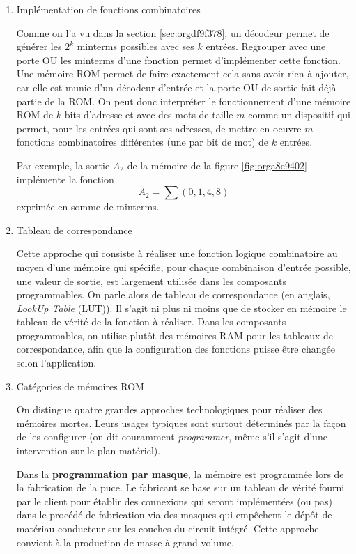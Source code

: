 \documentclass[letter, oneside]{book}
\begin{document}
\begin{enumerate}
\item Implémentation de fonctions combinatoires
\label{sec:orga763bcf}

Comme on l'a vu dans la section \ref{sec:orgdf9f378}, un décodeur permet de
générer les \(2^k\) minterms possibles avec ses \(k\)
entrées. Regrouper avec une porte OU les minterms d'une
fonction permet d'implémenter cette fonction. Une mémoire ROM permet
de faire exactement cela sans avoir rien à ajouter, car elle est munie
d'un décodeur d'entrée et la porte OU de sortie fait déjà partie de
la ROM. On peut donc interpréter le fonctionnement d'une mémoire ROM
de \(k\) bits d'adresse et avec des mots de taille \(m\) comme un
dispositif qui permet, pour les entrées qui sont ses adresses, de
mettre en oeuvre \(m\) fonctions combinatoires différentes (une par
bit de mot) de \(k\) entrées.

Par exemple, la sortie \(A_2\) de la mémoire de la figure
\ref{fig:orga8e9402} implémente la fonction $$A_2 = \sum (0,1,4,8)$$
exprimée en somme de minterms.

\item Tableau de correspondance
\label{sec:org0bb0564}

Cette approche qui consiste à réaliser une fonction logique
combinatoire au moyen d'une mémoire qui spécifie, pour chaque
combinaison d'entrée possible, une valeur de sortie, est largement
utilisée dans les composants programmables. On parle alors de tableau
de correspondance (en anglais, \emph{LookUp Table} (LUT)). Il s'agit ni
plus ni moins que de stocker en mémoire le tableau de vérité de la
fonction à réaliser. Dans les composants programmables, on utilise
plutôt des mémoires RAM pour les tableaux de correspondance, afin que
la configuration des fonctions puisse être changée selon
l'application.

\item Catégories de mémoires ROM
\label{sec:org066270d}

On distingue quatre grandes approches technologiques pour réaliser des
mémoires mortes. Leurs usages typiques sont surtout déterminés par la
façon de les configurer (on dit couramment \emph{programmer}, même s'il
s'agit d'une intervention sur le plan matériel).

Dans la \textbf{programmation par masque}, la mémoire est programmée lors de
la fabrication de la puce. Le fabricant se base sur un tableau de
vérité fourni par le client pour établir des connexions qui seront
implémentées (ou pas) dans le procédé de fabrication via des masques
qui empêchent le dépôt de matériau conducteur sur les couches du
circuit intégré.  Cette approche convient à la production de masse à
grand volume.


\end{enumerate}
\end{document}

